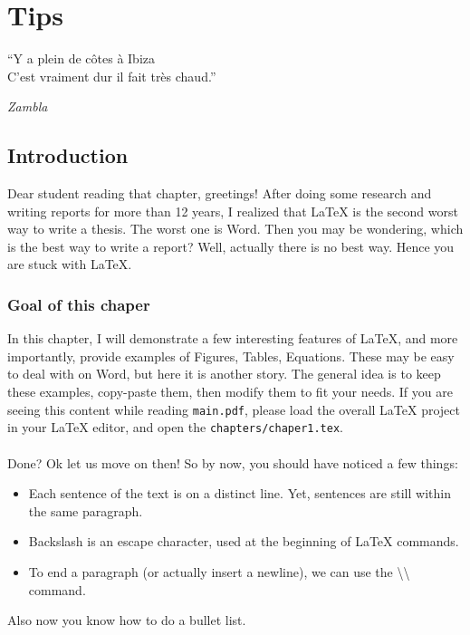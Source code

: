 
\chapter{Tips} %

\epigraph{``Y a plein de c\^otes \`a Ibiza\\C'est vraiment dur il fait tr\`es chaud.''}{\textit{Zambla}}

\label{chapter1} %

\section{Introduction}
Dear student reading that chapter, greetings!
After doing some research and writing reports for more than 12 years, I realized that LaTeX is the second worst way to write a thesis.
The worst one is Word.
Then you may be wondering, which is the best way to write a report?
Well, actually there is no best way.
Hence you are stuck with LaTeX.

\subsection{Goal of this chaper}
In this chapter, I will demonstrate a few interesting features of LaTeX, and more importantly, provide examples of Figures, Tables, Equations.
These may be easy to deal with on Word, but here it is another story.
The general idea is to keep these examples, copy-paste them, then modify them to fit your needs.
If you are seeing this content while reading \texttt{main.pdf}, please load the overall LaTeX project in your LaTeX editor, and open the \texttt{chapters/chaper1.tex}.
\\
\\
Done?
Ok let us move on then!
So by now, you should have noticed a few things:
\begin{itemize}
  \item Each sentence of the text is on a distinct line. Yet, sentences are still within the same paragraph.
  \item Backslash is an escape character, used at the beginning of LaTeX commands.
  \item To end a paragraph (or actually insert a newline), we can use the \textbackslash{}\textbackslash{} command.
\end{itemize}
Also now you know how to do a bullet list.

